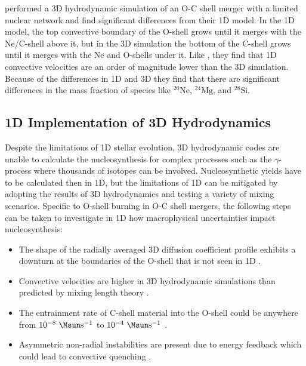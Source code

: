 \cite{rizzutiShellMergersLate2024a} performed a 3D hydrodynamic simulation of an O-C shell merger with a limited nuclear network and find significant differences from their 1D model.
In the 1D model, the top convective boundary of the O-shell grows until it merges with the Ne/C-shell above it, but in the 3D simulation the bottom of the C-shell grows until it merges with the Ne and O-shells under it.
Like \cite{jonesIdealizedHydrodynamicSimulations2017}, they find that 1D convective velocities are an order of magnitude lower than the 3D simulation.
Because of the differences in 1D and 3D they find that there are significant differences in the mass fraction of species like $^{20}\mathrm{Ne}$, $^{24}\mathrm{Mg}$, and $^{28}\mathrm{Si}$.

\subsection{1D Implementation of 3D Hydrodynamics}\label{sec:intro_1dimplementof3d}

Despite the limitations of 1D stellar evolution, 3D hydrodynamic codes are unable to calculate the nucleosynthesis for complex processes such as the $\gamma$-process where thousands of isotopes can be involved.
Nucleosynthetic yields have to be calculated then in 1D, but the limitations of 1D can be mitigated by adopting the results of 3D hydrodynamics and testing a variety of mixing scenarios.
Specific to O-shell burning in O-C shell mergers, the following steps can be taken to investigate in 1D how macrophysical uncertainties impact nucleosynthesis:

\begin{itemize}
\item The shape of the radially averaged 3D diffusion coefficient profile exhibits a  downturn at the boundaries of the O-shell that is not seen in 1D \citep{meakinTurbulentConvectionStellar2007, jonesIdealizedHydrodynamicSimulations2017}.
\item Convective velocities are higher in 3D hydrodynamic simulations than predicted by mixing length theory \citep{jonesIdealizedHydrodynamicSimulations2017, rizzutiShellMergersLate2024a}.
\item The entrainment rate of C-shell material into the O-shell could be anywhere from $10^{-8}~\Msun \mathrm{s^{-1}}$ to $10^{-4}~\Msun \mathrm{s^{-1}}$ \citep{andrassy3DHydrodynamicSimulations2020}.
\item Asymmetric non-radial instabilities are present due to energy feedback which could lead to convective quenching \citep{andrassy3DHydrodynamicSimulations2020}. 
\end{itemize}

